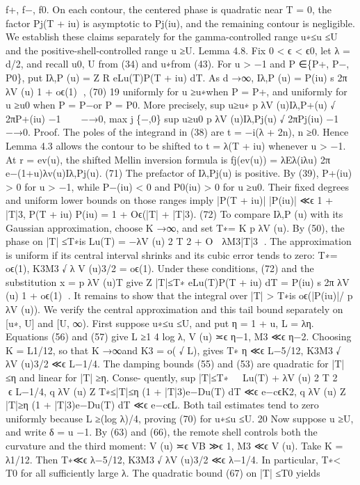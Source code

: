 f+, f−, f0. On each contour, the centered phase is quadratic near T = 0, the factor Pj(T + iu)
is asymptotic to Pj(iu), and the remaining contour is negligible. We establish these claims
separately for the gamma-controlled range u∗≤u ≤U and the positive-shell-controlled range
u ≥U.
Lemma 4.8. Fix 0 < ϵ < ϵ0, let λ = d/2, and recall u0, U from (34) and u∗from (43). For
u > −1 and P ∈\{P+, P−, P0\}, put
Iλ,P (u) =
Z
R
eLu(T)P(T + iu) dT.
As d →∞,
Iλ,P (u) = P(iu)
s
2π
λV (u)
 1 + oϵ(1)
,
(70)
19
uniformly for u ≥u∗when P = P+, and uniformly for u ≥u0 when P = P−or P = P0. More
precisely,
sup
u≥u∗
p
λV (u)Iλ,P+(u)
√
2πP+(iu)
−1
 −→0,
max
j∈\{−,0\} sup
u≥u0
p
λV (u)Iλ,Pj(u)
√
2πPj(iu)
−1
 −→0.
Proof. The poles of the integrand in (38) are t = −i(λ + 2n), n ≥0. Hence Lemma 4.3 allows
the contour to be shifted to t = λ(T + iu) whenever u > −1. At r = ev(u), the shifted Mellin
inversion formula is
fj(ev(u)) = λEλ(iλu)
2π
e−(1+u)λv(u)Iλ,Pj(u).
(71)
The prefactor of Iλ,Pj(u) is positive. By (39), P+(iu) > 0 for u > −1, while P−(iu) < 0 and
P0(iu) > 0 for u ≥u0. Their ﬁxed degrees and uniform lower bounds on those ranges imply
|P(T + iu)|
|P(iu)|
≪ϵ 1 + |T|3,
P(T + iu)
P(iu)
= 1 + Oϵ(|T| + |T|3).
(72)
To compare Iλ,P (u) with its Gaussian approximation, choose K →∞, and set
T∗=
K
p
λV (u).
By (50), the phase on |T| ≤T∗is
Lu(T) = −λV (u)
2
T 2 + O

λM3|T|3
.
The approximation is uniform if its central interval shrinks and its cubic error tends to zero:
T∗= oϵ(1),
K3M3
√
λ V (u)3/2 = oϵ(1).
Under these conditions, (72) and the substitution x =
p
λV (u)T give
Z
|T|≤T∗
eLu(T)P(T + iu) dT = P(iu)
s
2π
λV (u)
 1 + oϵ(1)
.
It remains to show that the integral over |T| > T∗is oϵ(|P(iu)|/
p
λV (u)). We verify the central
approximation and this tail bound separately on [u∗, U] and [U, ∞).
First suppose u∗≤u ≤U, and put η = 1 + u, L = λη. Equations (56) and (57) give
L ≥1
4 log λ,
V (u) ≍ϵ η−1,
M3 ≪ϵ η−2.
Choosing K = L1/12, so that K →∞and K3 = o(
√
L), gives
T∗
η ≪ϵ L−5/12,
K3M3
√
λV (u)3/2 ≪ϵ L−1/4.
The damping bounds (55) and (53) are quadratic for |T| ≤η and linear for |T| ≥η. Conse-
quently,
sup
|T|≤T∗
Lu(T) + λV (u)
2
T 2
 ≪ϵ L−1/4,
q
λV (u)
Z
T∗≤|T|≤η
(1 + |T|3)e−Du(T) dT ≪ϵ e−cϵK2,
q
λV (u)
Z
|T|≥η
(1 + |T|3)e−Du(T) dT ≪ϵ e−cϵL.
Both tail estimates tend to zero uniformly because L ≥(log λ)/4, proving (70) for u∗≤u ≤U.
20
Now suppose u ≥U, and write δ = u −1. By (63) and (66), the remote shell controls both
the curvature and the third moment:
V (u) ≍ϵ VB ≫ϵ 1,
M3 ≪ϵ V (u).
Take K = λ1/12. Then
T∗≪ϵ λ−5/12,
K3M3
√
λV (u)3/2 ≪ϵ λ−1/4.
In particular, T∗< T0 for all suﬃciently large λ. The quadratic bound (67) on |T| ≤T0 yields
